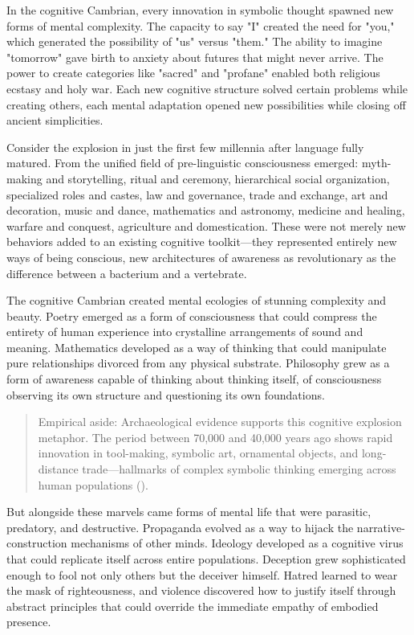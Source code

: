 In the cognitive Cambrian, every innovation in symbolic thought spawned new forms of mental complexity. The capacity to say "I" created the need for "you," which generated the possibility of "us" versus "them." The ability to imagine "tomorrow" gave birth to anxiety about futures that might never arrive. The power to create categories like "sacred" and "profane" enabled both religious ecstasy and holy war. Each new cognitive structure solved certain problems while creating others, each mental adaptation opened new possibilities while closing off ancient simplicities.

Consider the explosion in just the first few millennia after language fully matured. From the unified field of pre-linguistic consciousness emerged: myth-making and storytelling, ritual and ceremony, hierarchical social organization, specialized roles and castes, law and governance, trade and exchange, art and decoration, music and dance, mathematics and astronomy, medicine and healing, warfare and conquest, agriculture and domestication. These were not merely new behaviors added to an existing cognitive toolkit—they represented entirely new ways of being conscious, new architectures of awareness as revolutionary as the difference between a bacterium and a vertebrate.

The cognitive Cambrian created mental ecologies of stunning complexity and beauty. Poetry emerged as a form of consciousness that could compress the entirety of human experience into crystalline arrangements of sound and meaning. Mathematics developed as a way of thinking that could manipulate pure relationships divorced from any physical substrate. Philosophy grew as a form of awareness capable of thinking about thinking itself, of consciousness observing its own structure and questioning its own foundations.

\begin{quote}\small
Empirical aside: Archaeological evidence supports this cognitive explosion metaphor. The period between 70,000 and 40,000 years ago shows rapid innovation in tool-making, symbolic art, ornamental objects, and long-distance trade—hallmarks of complex symbolic thinking emerging across human populations (\parencite{mellars2007neanderthal,klein2009birth}).
\end{quote}

But alongside these marvels came forms of mental life that were parasitic, predatory, and destructive. Propaganda evolved as a way to hijack the narrative-construction mechanisms of other minds. Ideology developed as a cognitive virus that could replicate itself across entire populations. Deception grew sophisticated enough to fool not only others but the deceiver himself. Hatred learned to wear the mask of righteousness, and violence discovered how to justify itself through abstract principles that could override the immediate empathy of embodied presence.

